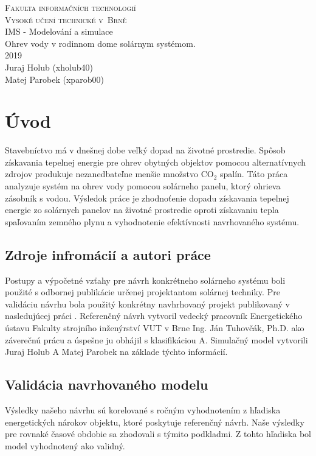 \documentclass[a4paper, 11pt]{article}
\begin{document}
\begin{titlepage}
	\begin{center}
		\Huge
		\textsc{Fakulta informačních technologií \\
			Vysoké učení technické v~Brně} \\
		{\LARGE
			IMS - Modelování a simulace \\ 
			\medskip 
			\Large{
				Ohrev vody v rodinnom dome solárnym systémom.
			}
			}
		\setlength{\parindent}{0.3em}\\
		{\Large 2019} \\
		{\Large Juraj Holub (xholub40)}\\
		{\Large Matej Parobek (xparob00)}
	\end{center}
\end{titlepage}

\tableofcontents
\newpage

\section{Úvod}
Stavebníctvo má v dnešnej dobe veľký dopad na životné prostredie. Spôsob získavania tepelnej energie pre ohrev obytných objektov pomocou alternatívnych zdrojov produkuje nezanedbateľne menšie množstvo CO$_2$ spalín. Táto práca analyzuje systém na ohrev vody pomocou solárneho panelu, ktorý ohrieva zásobník s vodou. Výsledok práce je zhodnoťenie dopadu získavania tepelnej energie zo solárnych panelov na životné prostredie oproti získavaniu tepla spaľovaním zemného plynu a vyhodnotenie efektívnosti navrhovaného systému. 

\subsection{Zdroje infromácií a autori práce}
Postupy a výpočetné vzťahy pre návrh konkrétneho solárneho systému boli použité s odbornej publikácie \cite{Cihelka} určenej projektantom solárnej techniky. Pre validáciu návrhu bola použitý konkrétny navhrhovaný projekt publikovaný v nasledujúcej práci \cite{bc_solar_system}. Referenčný návrh vytvoril vedecký pracovník Energetického ústavu Fakulty strojního inženýrství VUT v Brne Ing. Ján Tuhovčák, Ph.D. ako záverečnú prácu a úspešne ju obhájil s klasifikáciou A. Simulačný model vytvorili Juraj Holub A Matej Parobek na základe týchto informácií. 

\subsection{Validácia navrhovaného modelu}
Výsledky našeho návrhu sú korelované s ročným vyhodnotením z hľadiska energetických nárokov objektu, ktoré poskytuje referenčný návrh. Naše výsledky pre rovnaké časové obdobie sa zhodovali s týmito podkladmi. Z tohto hľadiska bol model vyhodnotený ako validný.
\end{document}
